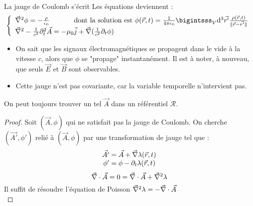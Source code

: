 	La jauge de Coulomb s'écrit 
	Les équations deviennent :
$$
	\left\{ \begin{array}{l}
		\nab^2\phi=-\frac{\rho}{\epsilon_0} \text{ \hspace{1cm} dont la solution est } \phi(\vec{r},t)=\frac{1}{4\pi\epsilon_0}\bigintsss_V\dif^3\vec{r'}\frac{\rho(\vec{r},t)}{\parallel\vec{r}-\vec{r'}\parallel}\\
		\nab^2-\frac{1}{c^2}\partial_t^2\vec{A}=-\mu_0\vec{j}+\nab(\frac{1}{c^2}\partial_t\phi)	
	\end{array} \right.
$$
	
	\begin{remarks}
		\hspace{1pt}
		\begin{itemize}
			\item On sait que les signaux électromagnétiques se propagent dans le vide à la vitesse $c$, alors que $\phi$ se "propage" instantanément. Il est à noter, à nouveau, que seuls $\vec{E}$ et $\vec{B}$ sont observables.
			\item Cette jauge n'est pas covariante, car la variable temporelle n'intervient pas.
		\end{itemize}
	\end{remarks}
	
	\begin{theorem}
		On peut toujours trouver un tel $\vec{A}$ dans un référentiel $\mathcal{R}$.
	\end{theorem}
	
	\begin{proof}
		Soit $(\vec{A},\phi)$ qui ne satisfait pas la jauge de Coulomb. On cherche $(\vec{A'},\phi')$ relié à $(\vec{A},\phi)$ par une transformation de jauge tel que :
$$
		\begin{array}{r@{\;}l}
				\vec{A'} &=\vec{A}+\nab\lambda(\vec{r},t)\\
			\phi'&=\phi-\partial_t\lambda(\vec{r},t)
		\end{array}
$$
$$
		\vec{\nabla}\cdot\vec{A}=0=\vec{\nabla}\cdot\vec{A}+\vec{\nabla}^2\lambda
$$
	Il suffit de résoudre l'équation de Poisson $\vec{\nabla}^2\lambda=-\vec{\nabla}\cdot\vec{A}$ \\\qedhere
	\end{proof}
	
